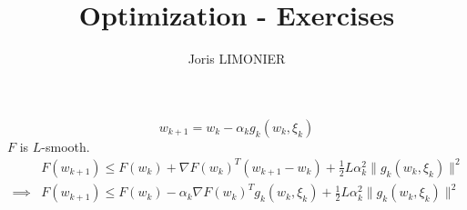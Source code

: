 \documentclass{article}
\title{Optimization - Exercises}
\author{Joris LIMONIER}
\newcommand{\1}{\mathbf{1}}
\begin{document}
\maketitle

\begin{equation*}
  w_{k+1} = w_k - \alpha_k g_k(w_k, \xi_k)
\end{equation*}
\(F\) is \(L\)-smooth.
\begin{align*}
           &
  F(w_{k+1}) \leq F(w_k) + \nabla F(w_k)^T (w_{k+1} - w_k) + \frac{1}{2} L \alpha_k^2 \|g_k(w_k, \xi_k)\|^2          \\
  \implies &
  F(w_{k+1}) \leq F(w_k) - \alpha_k \nabla F(w_k)^T g_k (w_k, \xi_k) + \frac{1}{2} L \alpha_k^2 \|g_k(w_k, \xi_k)\|^2 \\
\end{align*}
\end{document}
